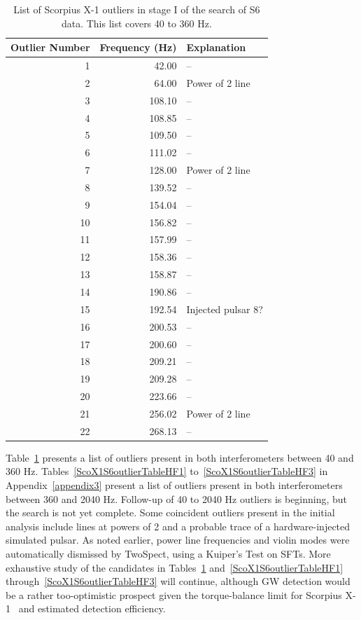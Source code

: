 \begin{table}
\begin{center}
\begin{tabular}{r r l}
Outlier Number & Frequency (Hz) & Explanation \\
\hline
1 & 42.00 & -- \\
2 & 64.00 & Power of 2 line \\
3 & 108.10 & -- \\
4 & 108.85 & -- \\
5 & 109.50 & -- \\
6 & 111.02 & -- \\
7 & 128.00 & Power of 2 line \\
8 & 139.52 & -- \\
9 & 154.04 & -- \\
10 & 156.82 & -- \\
11 & 157.99 & -- \\
12 & 158.36 & -- \\
13 & 158.87 & -- \\
14 & 190.86 & -- \\
15 & 192.54 & Injected pulsar 8? \\
16 & 200.53 & -- \\
17 & 200.60 & -- \\
18 & 209.21 & -- \\
19 & 209.28 & -- \\
20 & 223.66 & -- \\
21 & 256.02 & Power of 2 line \\
22 & 268.13 & -- \\
\end{tabular}
\caption{List of Scorpius X-1 outliers in stage I of the search of S6 data. This list covers 40 to 360 Hz.}
\label{ScoX1S6outlierTable}
\end{center}
\end{table}



Table~\ref{ScoX1S6outlierTable} presents a list of outliers present in both interferometers between 40 and 360 Hz.
Tables~\ref{ScoX1S6outlierTableHF1} to~\ref{ScoX1S6outlierTableHF3} in Appendix~\ref{appendix3} present a list of outliers present in both interferometers between 360 and 2040 Hz.
Follow-up of 40 to 2040 Hz outliers is beginning, but the search is not yet complete.
Some coincident outliers present in the initial analysis include lines at powers of 2 and a probable trace of a hardware-injected simulated pulsar.
As noted earlier, power line frequencies and violin modes were automatically dismissed by TwoSpect, using a Kuiper's Test on SFTs.
More exhaustive study of the candidates in Tables~\ref{ScoX1S6outlierTable} and~\ref{ScoX1S6outlierTableHF1} through~\ref{ScoX1S6outlierTableHF3} will continue, although GW detection would be a rather too-optimistic prospect given the torque-balance limit for Scorpius X-1~\cite{Bildsten1998} and estimated detection efficiency.

